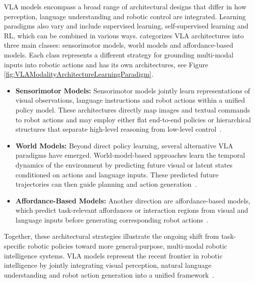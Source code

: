 \ac{VLA} models encompass a broad range of architectural designs that differ in how perception, language understanding and robotic control are integrated. Learning paradigms also vary and include supervised learning, self-supervised learning and \ac{RL}, which can be combined in various ways.
\textcite{Kawaharazuka2025VisionLanguageActionMF} categorizes \ac{VLA} architectures into three main classes: sensorimotor models, world models and affordance-based models. Each class represents a different strategy for grounding multi-modal inputs into robotic actions and has its own architectures, see Figure \ref{fig:VLAModalityArchitectureLearningParadigm}.
\begin{itemize}
    \item \textbf{Sensorimotor Models:} Sensorimotor models jointly learn representations of visual observations, language instructions and robot actions within a unified policy model. These architectures directly map images and textual commands to robot actions and may employ either flat end-to-end policies or hierarchical structures that separate high-level reasoning from low-level control~\cite{Kawaharazuka2025VisionLanguageActionMF}.
    \item \textbf{World Models:} Beyond direct policy learning, several alternative \ac{VLA} paradigms have emerged. World-model-based approaches learn the temporal dynamics of the environment by predicting future visual or latent states conditioned on actions and language inputs. These predicted future trajectories can then guide planning and action generation~\cite{Kawaharazuka2025VisionLanguageActionMF}. 
    \item \textbf{Affordance-Based Models:} Another direction are affordance-based models, which predict task-relevant affordances or interaction regions from visual and language inputs before generating corresponding robot actions~\cite{Kawaharazuka2025VisionLanguageActionMF}.
\end{itemize}

Together, these architectural strategies illustrate the ongoing shift from task-specific robotic policies toward more general-purpose, multi-modal robotic intelligence systems. \ac{VLA} models represent the recent frontier in robotic intelligence by jointly integrating visual perception, natural language understanding and robot action generation into a unified framework~\cite{Kawaharazuka2025VisionLanguageActionMF}.


